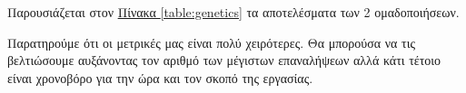 Παρουσιάζεται στον
\hyperref[table:genetics]{Πίνακα \ref{table:genetics}}
τα αποτελέσματα των 2 ομαδοποιήσεων.

\begin{table}[htb]
\centering
{}
\caption{Ομαδοποίηση με γενετικούς}\label{table:genetics}
\end{table}

Παρατηρούμε ότι οι μετρικές μας είναι πολύ χειρότερες. Θα μπορούσα να τις βελτιώσουμε αυξάνοντας τον αριθμό των μέγιστων επαναλήψεων αλλά κάτι τέτοιο είναι χρονοβόρο για την ώρα και τον σκοπό της εργασίας.


